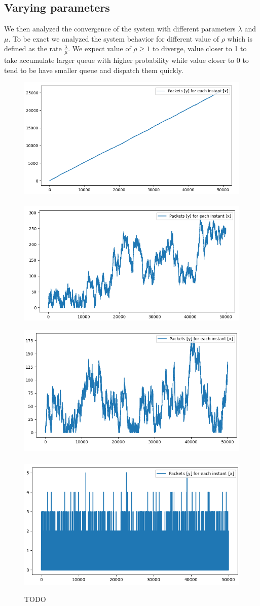 \documentclass[10pt,a4paper]{article}
\begin{document}
\subsection*{Varying parameters}

We then analyzed the convergence of the system with different parameters \(\lambda\) and \(\mu\). To be exact we analyzed the system behavior for different value of \(\rho\) which is defined as the rate \(\frac \lambda \mu\). We expect value of \(\rho \ge 1\) to diverge, value closer to 1 to take accumulate larger queue with higher probability while value closer to 0 to tend to be have smaller queue and dispatch them quickly.


\begin{figure}[ht!]
	\centering
	\includegraphics[width=0.45\linewidth]{img/pho2}
	\label{fig:pho2}
	~
	\includegraphics[width=0.45\linewidth]{img/rho1}
	\label{fig:rho1}

	\includegraphics[width=0.45\linewidth]{img/rho0.99}
	\label{fig:rho099}
	~
	\includegraphics[width=0.45\linewidth]{img/rho0.1}
	\label{fig:rho010}

	\caption{TODO} %
	\label{img:data-vis}
\end{figure}
\end{document}
